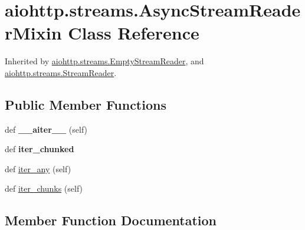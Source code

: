 \hypertarget{classaiohttp_1_1streams_1_1_async_stream_reader_mixin}{}\section{aiohttp.\+streams.\+Async\+Stream\+Reader\+Mixin Class Reference}
\label{classaiohttp_1_1streams_1_1_async_stream_reader_mixin}


Inherited by \hyperlink{classaiohttp_1_1streams_1_1_empty_stream_reader}{aiohttp.\+streams.\+Empty\+Stream\+Reader}, and \hyperlink{classaiohttp_1_1streams_1_1_stream_reader}{aiohttp.\+streams.\+Stream\+Reader}.

\subsection*{Public Member Functions}
\begin{DoxyCompactItemize}
\item 
\mbox{\label{classaiohttp_1_1streams_1_1_async_stream_reader_mixin_a7754a951d6a3f229d1edfbb425926e0d}} 
def {\bfseries \+\_\+\+\_\+aiter\+\_\+\+\_\+} (self)
\item 
\mbox{\label{classaiohttp_1_1streams_1_1_async_stream_reader_mixin_a5f1cd542c2742272e87b306cb36a205e}} 
def {\bfseries iter\+\_\+chunked}
\item 
def \hyperlink{classaiohttp_1_1streams_1_1_async_stream_reader_mixin_aed2e21b22adde13e76119adcd2073bcf}{iter\+\_\+any} (self)
\item 
def \hyperlink{classaiohttp_1_1streams_1_1_async_stream_reader_mixin_a2eeaa27b3924bfdaf7a3d0a5cfcc2ea6}{iter\+\_\+chunks} (self)
\end{DoxyCompactItemize}


\subsection{Member Function Documentation}
\mbox{\label{classaiohttp_1_1streams_1_1_async_stream_reader_mixin_aed2e21b22adde13e76119adcd2073bcf}} 
